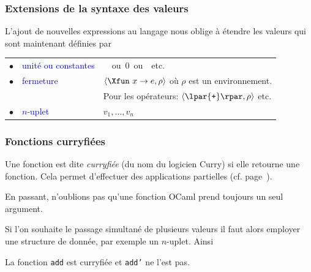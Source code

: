 %
\begin{frame}
\frametitle{Extensions de la syntaxe des valeurs}

L'ajout de nouvelles expressions au langage nous oblige à étendre les
valeurs qui sont maintenant définies par

\bigskip

\begin{tabular}{rll}
    $\bullet$
  & \textcolor{blue}{unité ou constantes}
  & \unit \ ou \textsf{0} ou \Xtrue{} etc.\\
    $\bullet$
  & \textcolor{blue}{fermeture}
  & $\langle\Xfun \,\, x \rightarrow e, \rho\rangle$ où $\rho$ est un
    environnement.\\
  &
  & Pour les opérateurs: $\langle\lpar{\texttt{+}}\rpar, \rho\rangle$
    etc.\\
    $\bullet$
  & \textcolor{blue}{$n$-uplet}
  & $v_1, \ldots, v_n$
\end{tabular}

\end{frame}

%
\begin{frame}
\frametitle{Fonctions curryfiées}

Une fonction est dite \emph{curryfiée} (du nom du logicien Curry) si
elle retourne une fonction. Cela permet d'effectuer des applications
partielles (cf. page~\pageref{application_partielle}).

\bigskip

En passant, n'oublions pas qu'une fonction OCaml prend toujours un
seul argument.

\bigskip

Si l'on souhaite le passage simultané de plusieurs valeurs il faut
alors employer une structure de donnée, par exemple un
$n$-uplet. Ainsi





\bigskip

La fonction \texttt{\small add} est curryfiée et \texttt{\small add'}
ne l'est pas.

\end{frame}

